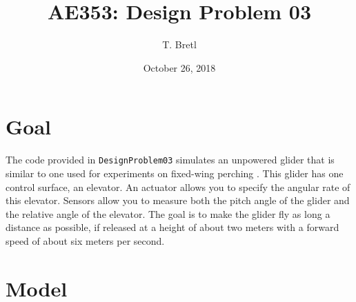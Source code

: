 \documentclass[12pt]{article}
\title{AE353: Design Problem 03}
\author{T. Bretl}
\date{October 26, 2018}
\begin{document}
\maketitle


\section{Goal}

The code provided in \lstinline!DesignProblem03! simulates an unpowered glider that is similar to one used for experiments on fixed-wing perching \cite{Roberts2009,Moore2014}. This glider has one control surface, an elevator. An actuator allows you to specify the angular rate of this elevator. Sensors allow you to measure both the pitch angle of the glider and the relative angle of the elevator. The goal is to make the glider fly as long a distance as possible, if released at a height of about two meters with a forward speed of about six meters per second.

\section{Model}
\end{document}
